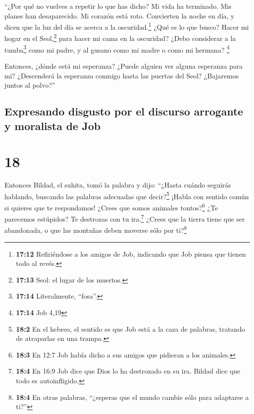  ``¿Por qué no vuelves a repetir lo que has dicho?
 Mi vida ha terminado. Mis planes han desaparecido. Mi
corazón está roto.  Convierten la noche en día, y dicen
que la luz del día se acerca a la oscuridad.\footnote{\textbf{17:12}
  Refiriéndose a los amigos de Job, indicando que Job piensa que tienen
  todo al revés.}  ¿Qué es lo que busco? Hacer mi hogar
en el Seol,\footnote{\textbf{17:13} Seol: el lugar de los muertos.} para
hacer mi cama en la oscuridad?  ¿Debo considerar a la
tumba\footnote{\textbf{17:14} Literalmente, ``fosa''.} como mi padre, y
al gusano como mi madre o como mi hermana? \footnote{\textbf{17:14} Job
  4,19}

 Entonces, ¿dónde está mi esperanza? ¿Puede alguien ver
alguna esperanza para mí?  ¿Descenderá la esperanza
conmigo hasta las puertas del Seol? ¿Bajaremos juntos al polvo?''

\hypertarget{expresando-disgusto-por-el-discurso-arrogante-y-moralista-de-job}{%
\subsection{Expresando disgusto por el discurso arrogante y moralista de
Job}\label{expresando-disgusto-por-el-discurso-arrogante-y-moralista-de-job}}

\hypertarget{section-17}{%
\section{18}\label{section-17}}

 Entonces Bildad, el suhita, tomó la palabra y dijo:
 ``¿Hasta cuándo seguirás hablando, buscando las palabras
adecuadas que decir?\footnote{\textbf{18:2} En el hebreo, el sentido es
  que Job está a la caza de palabras, tratando de atraparlas en una
  trampa.} ¡Habla con sentido común si quieres que te respondamos!
 ¿Crees que somos animales tontos?\footnote{\textbf{18:3}
  En 12:7 Job había dicho a sus amigos que pidieran a los animales.} ¿Te
parecemos estúpidos?  Te destrozas con tu ira.\footnote{\textbf{18:4}
  En 16:9 Job dice que Dios lo ha destrozado en su ira. Bildad dice que
  todo es autoinfligido.} ¿Crees que la tierra tiene que ser abandonada,
o que las montañas deben moverse sólo por ti?\footnote{\textbf{18:4} En
  otras palabras, ``¿esperas que el mundo cambie sólo para adaptarse a
  ti?''}

